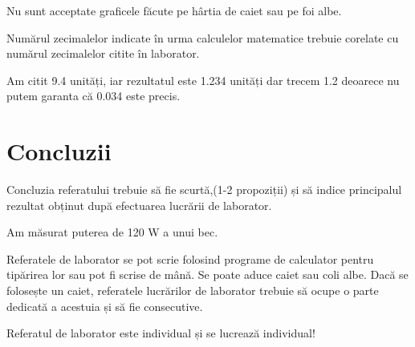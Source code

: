 \documentclass[12pt]{article}
\begin{document}
\begin{tcolorbox}[colback=yellow!10!white, colframe=black, title=Observație]
Nu sunt acceptate graficele făcute pe hârtia de caiet sau pe foi albe.
\end{tcolorbox}

Numărul zecimalelor indicate în urma calculelor matematice trebuie corelate cu numărul zecimalelor citite în laborator.

\begin{tcolorbox}[colback=yellow!10!white, colframe=black, title=Exemplu]
Am citit 9.4 unități, iar rezultatul este 1.234 unități dar trecem 1.2 deoarece nu putem garanta că 0.034 este precis.
\end{tcolorbox}

\section{Concluzii}
Concluzia referatului trebuie să fie scurtă,(1-2 propoziții) și să indice principalul rezultat obținut după efectuarea lucrării de laborator.

\begin{tcolorbox}[colback=yellow!10!white, colframe=black, title=Exemplu]
Am măsurat puterea de 120 W a unui bec.
\end{tcolorbox}

\begin{tcolorbox}[colback=yellow!10!white, colframe=black, title=Observație]
Referatele de laborator se pot scrie folosind programe de calculator pentru tipărirea lor sau pot fi scrise de mână.
Se poate aduce caiet sau coli albe. Dacă se folosește un caiet, referatele lucrărilor de laborator trebuie să ocupe o parte dedicată a acestuia
și să fie consecutive.
\end{tcolorbox}

\begin{tcolorbox}[colback=yellow!10!white, colframe=black, title=Observație]
Referatul de laborator este individual și se lucrează individual!
\end{tcolorbox}
\end{document}
